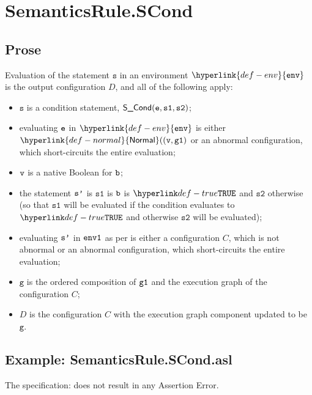 \documentclass{book}
\newcommand\ProseOrAbnormal[0]{or an abnormal configuration, which short-circuits the entire evaluation}
\newcommand\Normal[0]{\hyperlink{def-normal}{\textsf{Normal}}}
\newcommand\env[0]{\hyperlink{def-env}{\texttt{env}}}
\newcommand\vg[0]{\texttt{g}}
\newcommand\vs[0]{\texttt{s}}
\newcommand\vsone[0]{\texttt{s1}}
\newcommand\vstwo[0]{\texttt{s2}}
\begin{document}

\section{SemanticsRule.SCond \label{sec:SemanticsRule.SCond}}
    \subsection{Prose}
    Evaluation of the statement $\vs$ in an environment $\env$ is
    the output configuration $D$, and all of the following apply:
    \begin{itemize}
    \item $\vs$ is a condition statement, $\SCond(\ve, \vsone, \vstwo)$;
    \item evaluating $\texttt{e}$ in $\env$ is either $\Normal((\vv, \vgone)$ \ProseOrAbnormal;
    \item $\texttt{v}$ is a native Boolean for $\texttt{b}$;
    \item the statement $\texttt{s'}$ is $\vsone$ is $\texttt{b}$ is $\True$ and $\vstwo$ otherwise
    (so that $\vsone$ will be evaluated if the condition evaluates to $\True$ and otherwise
    $\vstwo$ will be evaluated);
    \item evaluating $\texttt{s'}$ in $\texttt{env1}$ as per  is either
    a configuration $C$, which is not abnormal \ProseOrAbnormal;
    \item $\vg$ is the ordered composition of $\texttt{g1}$ and the execution graph of the configuration $C$;
    \item $D$ is the configuration $C$ with the execution graph component updated to be $\vg$.
    \end{itemize}

    \subsection{Example: SemanticsRule.SCond.asl}
    The specification:
    does not result in any Assertion Error.


\end{document}
